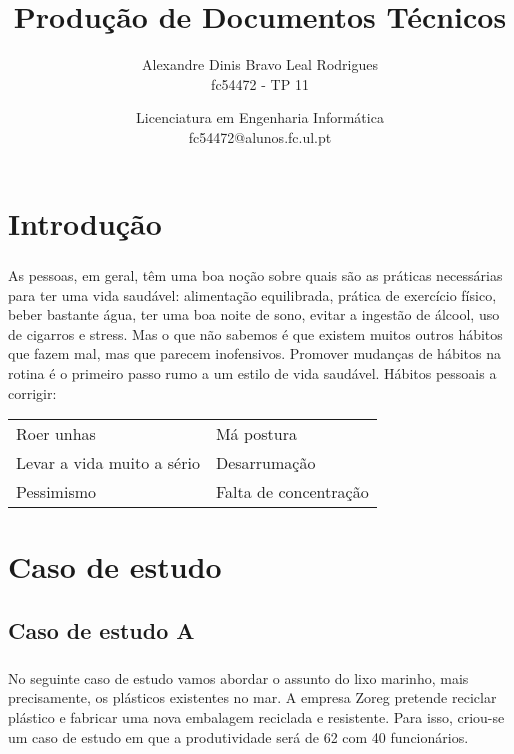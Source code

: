 \documentclass[11pt,a4paper]{report}
\author{Alexandre Dinis Bravo Leal Rodrigues \\fc54472 - TP 11\\}
\title{Produção de Documentos Técnicos}
\date{Licenciatura em Engenharia Informática\\fc54472@alunos.fc.ul.pt}
\begin{document}
\maketitle
{}
\thispagestyle{empty}
\tableofcontents
\listoffigures
\listoftables

\chapter{Introdução}
\setcounter{page}{1}
\paragraph{}
As pessoas, em geral, têm uma boa noção sobre quais são as práticas necessárias para ter uma vida saudável: alimentação equilibrada, prática de exercício físico, beber bastante água, ter uma boa noite de sono, evitar a ingestão de álcool, uso de cigarros e stress. Mas o que não sabemos é que existem muitos outros hábitos que fazem mal, mas que parecem inofensivos. Promover mudanças de hábitos na rotina é o primeiro passo rumo a um estilo de vida saudável.
Hábitos pessoais a corrigir:
\begin{table} [h!]
\begin{tabularx}{10 cm}{X  X }
Roer unhas & Má postura\\
Levar a vida muito a sério & Desarrumação \\ 
Pessimismo & Falta de concentração\\ 
\end{tabularx}
\end{table}
\chapter{Caso de estudo}
\section{Caso de estudo A}
\paragraph{}
No seguinte caso de estudo vamos abordar o assunto do lixo marinho, mais precisamente, os plásticos existentes no mar. A empresa Zoreg pretende reciclar plástico e fabricar uma nova embalagem reciclada e resistente. Para isso, criou-se um caso de estudo em que a produtividade será de 62 com 40 funcionários.
\end{document}
